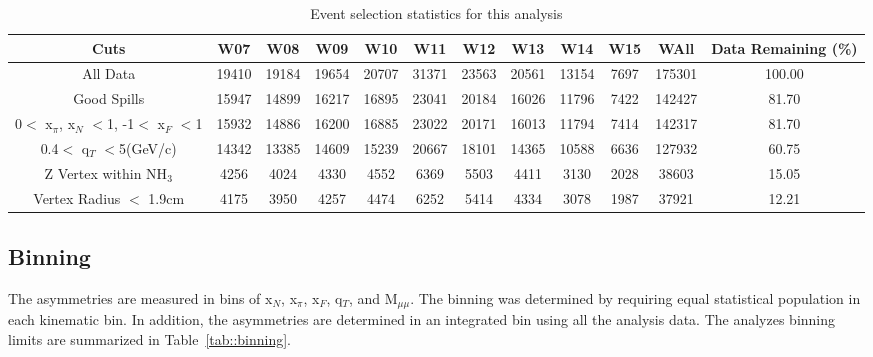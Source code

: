 \begin{table}[h!t]
  \centering
  \begin{tabular}{ |c|c|c|c|c|c|c|c|c|c|c|c| }
    \hline \textbf{Cuts}& \textbf{W07}& \textbf{W08}& \textbf{W09}&
    \textbf{W10}& \textbf{W11}& \textbf{W12}& \textbf{W13}& \textbf{W14}&
    \textbf{W15} & \textbf{WAll} & \textbf{Data Remaining (\%)} \\ \hline

    All Data& 19410& 19184& 19654& 20707& 31371& 23563& 20561& 13154& 7697&
    175301& 100.00 \\ \hline
    
    Good Spills& 15947& 14899& 16217& 16895& 23041& 20184& 16026& 11796& 7422&
    142427& 81.70 \\ \hline

    0$<$ x$_{\pi}$, x$_N$ $<$1, -1$<$ x$_F$ $<$1& 15932& 14886& 16200& 16885&
    23022& 20171& 16013& 11794& 7414& 142317& 81.70 \\ \hline

    0.4$<$ q$_T$ $<$5(GeV/c)& 14342& 13385& 14609& 15239& 20667& 18101& 14365&
    10588& 6636& 127932& 60.75 \\ \hline

    Z Vertex within NH$_3$& 4256& 4024& 4330& 4552& 6369& 5503& 4411& 3130&
    2028& 38603& 15.05 \\ \hline

    Vertex Radius $<$ 1.9cm& 4175& 3950& 4257& 4474& 6252& 5414& 4334& 3078&
    1987& 37921& 12.21 \\ \hline
    
  \end{tabular}
  \caption{Event selection statistics for this analysis}
  \label{tab::EventTable}
\end{table}

\subsection{Binning}
The asymmetries are measured in bins of x$_N$, x$_{\pi}$, x$_F$, q$_T$, and
M$_{\mu\mu}$.  The binning was determined by requiring equal statistical
population in each kinematic bin.  In addition, the asymmetries are determined
in an integrated bin using all the analysis data.  The analyzes binning limits
are summarized in Table~\ref{tab::binning}.

